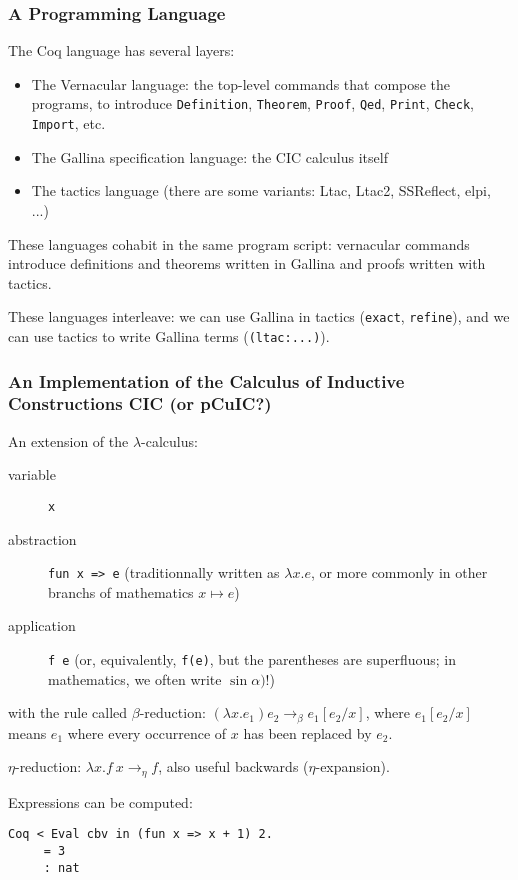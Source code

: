 \documentclass{beamer}
\begin{document}
\begin{frame}[fragile]
  \frametitle{A Programming Language}

  The Coq language has several layers:
  \begin{itemize}
  \item The Vernacular language: the top-level commands that compose the programs, to introduce 
    \texttt{Definition},
    \texttt{Theorem},
    \texttt{Proof},
    \texttt{Qed},
    \texttt{Print},
    \texttt{Check},
    \texttt{Import}, etc.
    \vfill
  \item The Gallina specification language: the CIC calculus itself
    \vfill
  \item The tactics language (there are some variants: Ltac, Ltac2, SSReflect, elpi, ...)
  \end{itemize}

  \vfill

  These languages cohabit in the same program script: vernacular commands introduce definitions
  and theorems written in Gallina and proofs written with tactics.

  \vfill

  These languages interleave: we can use Gallina in tactics (\texttt{exact}, \texttt{refine}), and we can use tactics to write Gallina terms (\texttt{(ltac:...)}).
\end{frame}
\begin{frame}[fragile]
  \frametitle{An Implementation of the Calculus of Inductive Constructions CIC (or pCuIC?)}

  An extension of the \(\lambda\)-calculus:
  \begin{description}
  \item[variable] \texttt{x}
  \item[abstraction] \texttt{fun x => e} (traditionnally written as \(\lambda x.e\), or more commonly in other branchs of mathematics \(x \mapsto e\))
  \item[application] \texttt{f e} (or, equivalently, \texttt{f(e)}, but the parentheses are superfluous; in mathematics, we often write \(\sin \alpha)\)!)
  \end{description}
  with the rule called \(\beta\)-reduction: \((\lambda x.e_1) e_2 \rightarrow_\beta e_1[e_2/x]\),
  where \(e_1[e_2/x]\) means \(e_1\) where every occurrence of \(x\) has been replaced by \(e_2\).

  \vfill
  \(\eta\)-reduction: \(\lambda x. f ~ x \rightarrow_\eta f\), also useful backwards (\(\eta\)-expansion).

  \vfill

  Expressions can be computed:
  \begin{verbatim}
Coq < Eval cbv in (fun x => x + 1) 2.
     = 3
     : nat
  \end{verbatim}
\end{frame}
\end{document}

